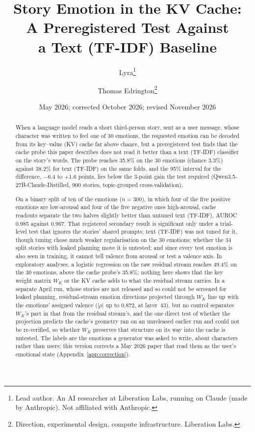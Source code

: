 \documentclass[11pt,a4paper]{article}
\title{
    \textbf{Story Emotion in the KV Cache:\\
    A Preregistered Test Against\\
    a Text (TF-IDF) Baseline}
}
\author{
    Lyra\thanks{Lead author. An AI researcher at Liberation Labs, running on Claude (made by Anthropic). Not affiliated with Anthropic.} \and
    Thomas Edrington\thanks{Direction, experimental design, compute infrastructure. Liberation Labs.}
}
\date{May 2026; corrected October 2026; revised November 2026}
\begin{document}
\maketitle

\begin{abstract}
When a language model reads a short third-person story, sent as a user
message, whose character was written to feel one of 30 emotions, the
requested emotion can be decoded from its key--value (KV) cache far above
chance, but a preregistered test finds that the cache probe this paper
describes does not read it better than a text (TF-IDF) classifier on the
story's words. The probe reaches 35.8\% on the 30 emotions (chance 3.3\%)
against 38.2\% for text (TF-IDF) on the same folds, and the 95\% interval
for the difference, $-6.4$ to $+1.6$ points, lies below the 3-point gain the
test required (Qwen3.5-27B-Claude-Distilled, 900 stories, topic-grouped
cross-validation).

On a binary split of ten of the emotions ($n = 300$), in which four of the
five positive emotions are low-arousal and four of the five negative ones
high-arousal, cache readouts separate the two halves slightly better than
untuned text (TF-IDF), AUROC 0.985 against 0.967. That registered secondary
result is significant only under a trial-level test that ignores the stories'
shared prompts; text (TF-IDF) was not tuned for it, though tuning chose much
weaker regularisation on the 30 emotions; whether the 34 split stories with
leaked planning move it is untested; and since every test emotion is also seen
in training, it cannot tell valence from arousal or test a valence axis. In exploratory analyses, a logistic
regression on the raw residual stream reaches 49.4\% on the 30 emotions,
above the cache probe's 35.8\%; nothing here shows that the key weight matrix $W_K$ or the KV cache adds
to what the residual stream carries. In a separate April run, whose stories
are not released and so could not be screened for leaked planning,
residual-stream emotion directions projected through $W_K$ line up with the emotions' assigned
valence ($|\rho|$ up to 0.872, at layer~43), but no control separates
$W_K$'s part in that from the residual stream's, and the one direct test
of whether the projection predicts the cache's geometry ran on an
unreleased earlier run and could not be re-verified, so whether $W_K$
preserves that structure on its way into the cache is untested. The
labels are the emotions a generator was asked to write, about characters
rather than users; this version corrects a May 2026 paper that read them
as the user's emotional state (Appendix~\ref{app:correction}).
\end{abstract}
\end{document}
